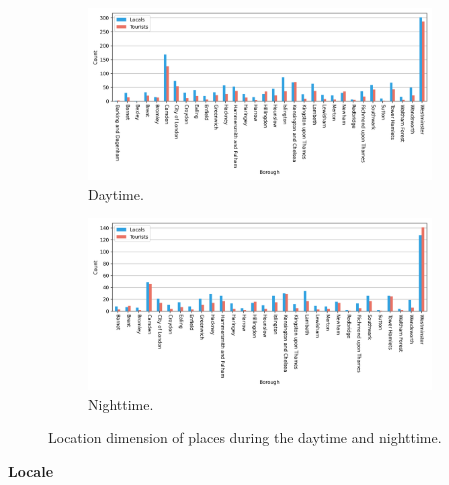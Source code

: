 \documentclass{article}
\theoremstyle{remark}
\begin{document}
\begin{figure}[!h]

\centering
\begin{subfigure}{0.6\textheight}
\centering
\includegraphics[width=0.9\linewidth]{figures/places_location_daytime.png} 
\caption{Daytime.}
\label{fig:places_location_daytime}
\end{subfigure}
\begin{subfigure}{0.6\textheight}
\centering
\includegraphics[width=0.9\linewidth]{figures/places_location_nighttime.png}
\caption{Nighttime.}
\label{fig:places_location_nighttime}
\end{subfigure}

\caption{Location dimension of places during the daytime and nighttime.}
\label{fig:places_location_day}
\end{figure}


\textbf{Locale}
\end{document}
